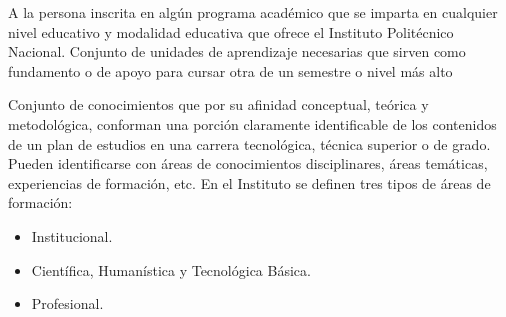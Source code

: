 \begin{bGlosario}
	 A la persona inscrita en algún programa académico que se imparta en cualquier nivel educativo y	modalidad educativa
	que ofrece el Instituto Politécnico	Nacional. %
 	 Conjunto de unidades de aprendizaje necesarias que sirven como fundamento o de apoyo
	para cursar otra de un semestre o nivel más alto %

 	 Conjunto de conocimientos que por su afinidad conceptual, teórica y metodológica, conforman
	una porción claramente identificable de los contenidos de un plan de estudios en una carrera tecnológica, técnica superior o de grado.
	Pueden identificarse con áreas de conocimientos disciplinares, áreas temáticas, experiencias de formación, etc. En el Instituto se definen tres tipos de áreas de formación:
	\begin{itemize}
		\item Institucional.
		\item Científica, Humanística y Tecnológica Básica.
		\item Profesional.
	\end{itemize}


\end{bGlosario}
